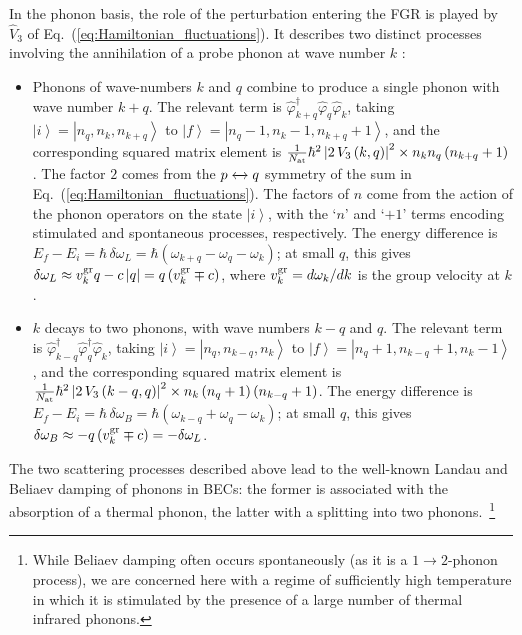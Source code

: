 \documentclass[aps,prd,notitlepage,amsfonts,amssymb,amsmath,nofootinbib,superscriptaddress,longbibliography]{revtex4-2}
\begin{document}
In the phonon basis, the role of the perturbation entering the FGR is played by $\hat{V}_{3}$ of Eq.~(\ref{eq:Hamiltonian_fluctuations}).
It describes two distinct processes involving the annihilation of a probe phonon at wave number $k$ :
\begin{itemize}
\item Phonons of wave-numbers $k$ and $q$ combine to produce a single phonon with wave number $k+q$. The relevant term is $\hat{\varphi}_{k+q}^{\dagger}\hat{\varphi}_{q}\hat{\varphi}_{k}$, taking $\left|i\right\rangle = \left|n_{q}, n_{k}, n_{k+q}\right\rangle$ to $\left|f\right\rangle = \left|n_{q}-1,n_{k}-1,n_{k+q}+1\right\rangle$, and the corresponding squared matrix element is $\frac{1}{N_{\rm at}} \hbar^{2} \left|2\, V_3\left(k,q\right)\right|^{2} \times n_{k} n_{q} \left(n_{k+q}+1\right)$. The factor $2$ comes from the $p \xleftrightarrow[]{} q$ symmetry of the sum in Eq.~(\ref{eq:Hamiltonian_fluctuations}). The factors of $n$ come from the action of the phonon operators on the state $\left|i\right\rangle$, with the `$n$' and `$+1$' terms encoding stimulated and spontaneous processes, respectively.  The energy difference is $E_{f}-E_{i} = \hbar \, \delta\omega_{L} = \hbar \left( \omega_{k+q}-\omega_{q}-\omega_{k} \right)$;
 at small $q$, this gives $\delta \omega_{L} \approx v^{\rm gr}_k q - c \left|q\right| = q \left(v^{\rm gr}_k \mp c\right)$, where $v^{\rm gr}_k = d\omega_{k}/dk$ is the group velocity at $k$.

\item $k$ decays to two phonons, with wave numbers $k-q$ and $q$.  The relevant term is $\hat{\varphi}_{k-q}^{\dagger}\hat{\varphi}_{q}^{\dagger}\hat{\varphi}_{k}$, taking $\left|i\right\rangle = \left|n_{q}, n_{k-q}, n_{k}\right\rangle$ to $\left|f\right\rangle = \left|n_{q}+1,n_{k-q}+1,n_{k}-1\right\rangle$, and the corresponding squared matrix element is $\frac{1}{N_{\rm at}} \hbar^{2} \left|2 \, V_3\left(k-q,q\right)\right|^{2} \times n_{k} \left(n_{q}+1\right) \left(n_{k-q}+1\right)$.  The energy difference is $E_{f}-E_{i} = \hbar \, \delta\omega_{B} = \hbar \left( \omega_{k-q}+\omega_{q}-\omega_{k} \right)$; at small $q$, this gives $\delta \omega_{B} \approx -q \left(v^{\rm gr}_k \mp c\right) = -\delta \omega_{L}$.
\end{itemize}
The two scattering processes described above lead to the well-known Landau and Beliaev damping of phonons in BECs: the former is associated with the absorption of a thermal phonon, the latter with a splitting into two phonons.~\footnote{While Beliaev damping often occurs spontaneously (as it is a $1 \to 2$-phonon process), we are concerned here with a regime of sufficiently high temperature in which it is stimulated by the presence of a large number of thermal infrared phonons.}
\end{document}
